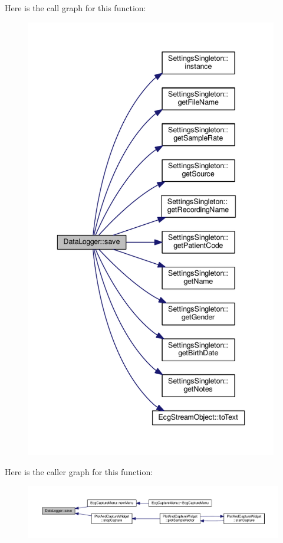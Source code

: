 Here is the call graph for this function\+:
\nopagebreak
\begin{figure}[H]
\begin{center}
\leavevmode
\includegraphics[height=550pt]{classDataLogger_a17296a2d3088e979c9b1f48e68caf9ad_cgraph}
\end{center}
\end{figure}




Here is the caller graph for this function\+:
\nopagebreak
\begin{figure}[H]
\begin{center}
\leavevmode
\includegraphics[width=350pt]{classDataLogger_a17296a2d3088e979c9b1f48e68caf9ad_icgraph}
\end{center}
\end{figure}


